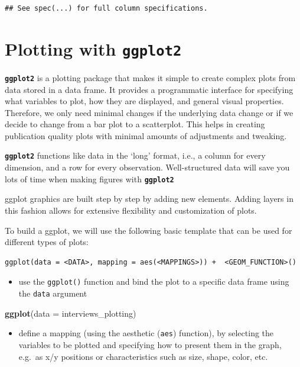 \documentclass[]{book}
\newenvironment{Shaded}{\begin{snugshade}}{\end{snugshade}}
\newcommand{\KeywordTok}[1]{\textcolor[rgb]{0.13,0.29,0.53}{\textbf{#1}}}
\newcommand{\DataTypeTok}[1]{\textcolor[rgb]{0.13,0.29,0.53}{#1}}
\newcommand{\NormalTok}[1]{#1}
\providecommand{\tightlist}{%
  \setlength{\itemsep}{0pt}\setlength{\parskip}{0pt}}
\begin{document}
\begin{verbatim}
## See spec(...) for full column specifications.
\end{verbatim}

\section{\texorpdfstring{Plotting with
\textbf{\texttt{ggplot2}}}{Plotting with ggplot2}}\label{plotting-with-ggplot2}

\textbf{\texttt{ggplot2}} is a plotting package that makes it simple to
create complex plots from data stored in a data frame. It provides a
programmatic interface for specifying what variables to plot, how they
are displayed, and general visual properties. Therefore, we only need
minimal changes if the underlying data change or if we decide to change
from a bar plot to a scatterplot. This helps in creating publication
quality plots with minimal amounts of adjustments and tweaking.

\textbf{\texttt{ggplot2}} functions like data in the `long' format,
i.e., a column for every dimension, and a row for every observation.
Well-structured data will save you lots of time when making figures with
\textbf{\texttt{ggplot2}}

ggplot graphics are built step by step by adding new elements. Adding
layers in this fashion allows for extensive flexibility and
customization of plots.

To build a ggplot, we will use the following basic template that can be
used for different types of plots:

\begin{verbatim}
ggplot(data = <DATA>, mapping = aes(<MAPPINGS>)) +  <GEOM_FUNCTION>()
\end{verbatim}

\begin{itemize}
\tightlist
\item
  use the \texttt{ggplot()} function and bind the plot to a specific
  data frame using the \texttt{data} argument
\end{itemize}

\begin{Shaded}
\begin{Highlighting}[]
\KeywordTok{ggplot}\NormalTok{(}\DataTypeTok{data =}\NormalTok{ interviews_plotting)}
\end{Highlighting}
\end{Shaded}

\begin{itemize}
\tightlist
\item
  define a mapping (using the aesthetic (\texttt{aes}) function), by
  selecting the variables to be plotted and specifying how to present
  them in the graph, e.g.~as x/y positions or characteristics such as
  size, shape, color, etc.
\end{itemize}
\end{document}

